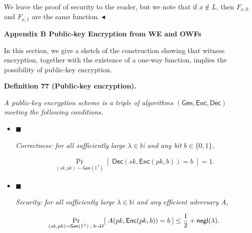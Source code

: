 \documentclass[10pt,a4paper]{article}
\begin{document}
We leave the proof of security to the reader, but we note that if $x\notin L$, then $F_{x,0}$ and $F_{x,1}$ are the same function.
$\blacktriangleleft$\par






\par\medskip\noindent\textbf{
Appendix B Public-key Encryption from WE and OWFs}\par




In this section, we give a sketch of the construction showing that witness encryption, together with the existence of a one-way function, implies the possibility of public-key encryption.\par





\par\medskip\noindent\textbf{
\textbf{Definition 77}\textbf{ }(Public-key encryption)\textbf{.}
}\par



\emph{A public-key encryption scheme is a triple of algorithms $({\mathsf{Gen}},{\mathsf{Enc}},{\mathsf{Dec}})$ meeting the following conditions.}\par


\begin{itemize}


\item[] 
$\blacksquare$ 


\emph{Correctness:}\emph{ for all sufficiently large }$\lambda\in\mathbb{N}$\emph{ and any bit }$b\in\{0,1\}$\emph{,}\par


\[\begin{gathered}
\Pr_{(sk,pk)\sim{\mathsf{Gen}}(1^{\lambda})}[\;{\mathsf{Dec}}(sk,{\mathsf{Enc}}(pk,b))=b\;]=1.
\end{gathered}\]





\item[] 
$\blacksquare$ 


\emph{Security:}\emph{ for all sufficiently large }$\lambda\in\mathbb{N}$\emph{ and any efficient adversary }$A$\emph{,}\par


\[\begin{gathered}
\Pr_{(sk,pk)\sim{\mathsf{Gen}}(1^{\lambda})\;;\;b\sim\mathcal{U}}[\;A(pk,{\mathsf{Enc}}(pk,b))=b\;]\leq\frac{1}{2}+{\sf negl}(\lambda).
\end{gathered}\]





\end{itemize}
\end{document}
